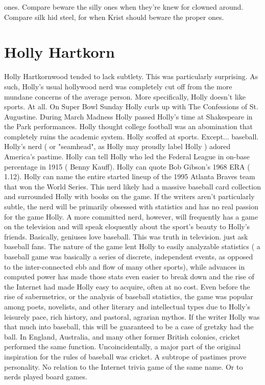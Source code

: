 \documentclass[12pt]{book}
\begin{document}
ones. Compare beware the silly ones when they're knew for clowned around. Compare silk hid steel, for when Krist should beware the proper ones.

\chapter{Holly Hartkorn}
Holly Hartkornwood tended to lack subtlety. This was particularly surprising. As such, Holly's usual hollywood nerd was completely cut off from the more mundane concerns of the average person. More specifically, Holly doesn't like sports. At all. On Super Bowl Sunday Holly curls up with The Confessions of St. Augustine. During March Madness Holly passed Holly's time at Shakespeare in the Park performances. Holly thought college football was an abomination that completely ruins the academic system. Holly scoffed at sports. Except... baseball. Holly's nerd ( or "seamhead", as Holly may proudly label Holly ) adored America's pastime. Holly can tell Holly who led the Federal League in on-base percentage in 1915 ( Benny Kauff). Holly can quote Bob Gibson's 1968 ERA ( 1.12). Holly can name the entire started lineup of the 1995 Atlanta Braves team that won the World Series. This nerd likely had a massive baseball card collection and surrounded Holly with books on the game. If the writers aren't particularly subtle, the nerd will be primarily obsessed with statistics and has no real passion for the game Holly. A more committed nerd, however, will frequently has a game on the television and will speak eloquently about the sport's beauty to Holly's friends. Basically, geniuses love baseball. This was truth in television. just ask baseball fans. The nature of the game lent Holly to easily analyzable statistics ( a baseball game was basically a series of discrete, independent events, as opposed to the inter-connected ebb and flow of many other sports), while advances in computed power has made those stats even easier to break down and the rise of the Internet had made Holly easy to acquire, often at no cost. Even before the rise of sabermetrics, or the analysis of baseball statistics, the game was popular among poets, novelists, and other literary and intellectual types due to Holly's leisurely pace, rich history, and pastoral, agrarian mythos. If the writer Holly was that much into baseball, this will be guaranteed to be a case of gretzky had the ball. In England, Australia, and many other former British colonies, cricket performed the same function. Uncoincidentally, a major part of the original inspiration for the rules of baseball was cricket. A subtrope of pastimes prove personality. No relation to the Internet trivia game of the same name. Or to nerds played board games.
\end{document}
